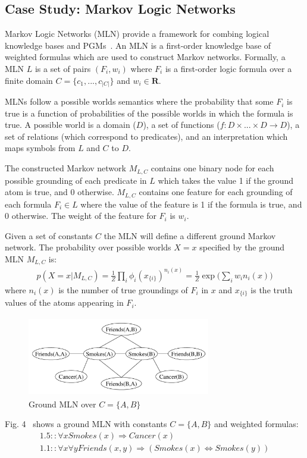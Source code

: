 \documentclass[11pt]{article}
\begin{document}
\subsection{Case Study: Markov Logic Networks}
Markov Logic Networks (MLN) provide a framework for combing logical knowledge bases and PGMs~\cite{Richardson:2006:MLN:1113907.1113910}.  An MLN is a first-order knowledge base of weighted formulas which are used to construct Markov networks.  Formally, a MLN $L$ is a set of pairs $(F_i, w_i)$ where $F_i$ is a first-order logic formula over a finite domain $C = \{c_1, ..., c_{|C|}\}$ and $w_i \in \mathbf{R}$.  

MLNs follow a possible worlds semantics where the probability that some $F_i$ is true is a function of probabilities of the possible worlds in which the formula is true.  A possible world is a domain ($D$), a set of functions ($f: D \times ... \times D \rightarrow D$), a set of relations (which correspond to predicates), and an interpretation which maps symbols from $L$ and $C$ to $D$.

The constructed Markov network $M_{L, C}$ contains one binary node for each possible grounding of each predicate in $L$ which takes the value 1 if the ground atom is true, and 0 otherwise.  $M_{L, C}$ contains one feature for each grounding of each formula $F_i \in L$ where the value of the feature is 1 if the formula is true, and 0 otherwise. The weight of the feature for $F_i$ is $w_i$.

Given a set of constants $C$ the MLN will define a different ground Markov network.  The probability over possible worlds $X = x$ specified by the ground MLN $M_{L, C}$ is:
\begin{gather*}
p(X = x | M_{L, C}) = \frac{1}{Z} \prod_i \phi_i(x_{\{i\}})^{n_i(x)} =  \frac{1}{Z} \exp \bigg( \sum_i w_i n_i(x) \bigg)
\end{gather*}
where $n_i(x)$ is the number of true groundings of $F_i$ in $x$ and $x_{\{i\}}$ is the truth values of the atoms appearing in $F_i$.

\begin{figure}
	\begin{center}
		\includegraphics[width=8cm, height=3.5cm]{mln}
	\end{center}
	\caption{Ground MLN over $C = \{A, B\}$}
\end{figure}
Fig. 4~\cite{Richardson:2006:MLN:1113907.1113910} shows a ground MLN with constants $C = \{A, B\}$ and weighted formulas:
\begin{gather*}
1.5 :: \forall x Smokes(x) \Rightarrow Cancer(x) \\
1.1 :: \forall x \forall y Friends(x, y) \Rightarrow (Smokes(x) \Leftrightarrow Smokes(y))
\end{gather*} 
\end{document}

